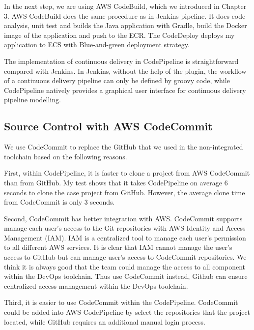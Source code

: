 \par
In the next step, we are using AWS CodeBuild, which we introduced in Chapter 3. AWS CodeBuild does the same procedure as in Jenkins pipeline. It does code analysis, unit test and builds the Java application with Gradle, build the Docker image of the application and push to the ECR. The CodeDeploy deploys my application to ECS with Blue-and-green deployment strategy.
\par
The implementation of continuous delivery in CodePipeline is straightforward compared with Jenkins. In Jenkins, without the help of the plugin, the workflow of a continuous delivery pipeline can only be defined by groovy code, while CodePipeline natively provides a graphical user interface for continuous delivery pipeline modelling. 
\subsection{Source Control with AWS CodeCommit}
We use CodeCommit to replace the GitHub that we used in the non-integrated toolchain based on the following reasons.
\par
First, within CodePipeline, it is faster to clone a project from AWS CodeCommit than from GitHub. My test shows that it takes CodePipeline on average 6 seconds to clone the case project from GitHub. However, the average clone time from CodeCommit is only 3 seconds.
\par
Second, CodeCommit has better integration with AWS. CodeCommit supports manage each user's access to the Git repositories with AWS Identity and Access Management (IAM). IAM is a centralized tool to manage each user's permission to all different AWS services. It is clear that IAM cannot manage the user's access to GitHub but can manage user's access to CodeCommit repositories. We think it is always good that the team could manage the access to all component within the DevOps toolchain. Thus use CodeCommit instead, Github can ensure centralized access management within the DevOps toolchain.
\par
Third, it is easier to use CodeCommit within the CodePipeline. CodeCommit could be added into AWS CodePipeline by select the repositories that the project located, while GitHub requires an additional manual login process.
